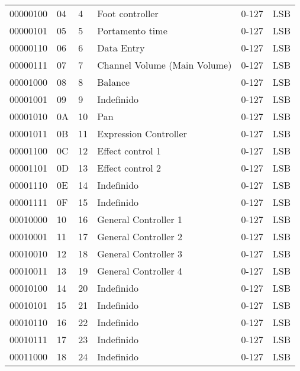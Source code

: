 \begin{center}
\begin{supertabular}{| C{2cm} | C{1.5cm} | C{1.5cm} | C{5.3cm} | C{1.5cm} | C{1.5cm} |}
             00000100 & 04 &  4  & Foot controller & 0-127 & LSB \\
                00000101 & 05 &  5  & Portamento time & 0-127 & LSB \\
             00000110 & 06 &  6  & Data Entry & 0-127 & LSB \\
                00000111 & 07 &  7  & Channel Volume (Main Volume) & 0-127 & LSB \\
             00001000 & 08 &  8  & Balance & 0-127 & LSB \\
                00001001 & 09 &  9  & Indefinido & 0-127 & LSB \\
             00001010 & 0A & 10  & Pan & 0-127 & LSB \\
                00001011 & 0B & 11  & Expression Controller & 0-127 & LSB \\
             00001100 & 0C & 12  & Effect control 1 & 0-127 & LSB \\
                00001101 & 0D & 13  & Effect control 2 & 0-127 & LSB \\
             00001110 & 0E & 14  & Indefinido & 0-127 & LSB \\
                00001111 & 0F & 15  & Indefinido & 0-127 & LSB \\
             00010000 & 10 & 16  & General Controller 1 & 0-127 & LSB \\
                00010001 & 11 & 17  & General Controller 2 & 0-127 & LSB \\
             00010010 & 12 & 18  & General Controller 3 & 0-127 & LSB \\
                00010011 & 13 & 19  & General Controller 4 & 0-127 & LSB \\
             00010100 & 14 & 20  & Indefinido & 0-127 & LSB \\
                00010101 & 15 & 21  & Indefinido & 0-127 & LSB \\
             00010110 & 16 & 22  & Indefinido & 0-127 & LSB \\
                00010111 & 17 & 23  & Indefinido & 0-127 & LSB \\
             00011000 & 18 & 24  & Indefinido & 0-127 & LSB \\

\end{supertabular}
\end{center}
